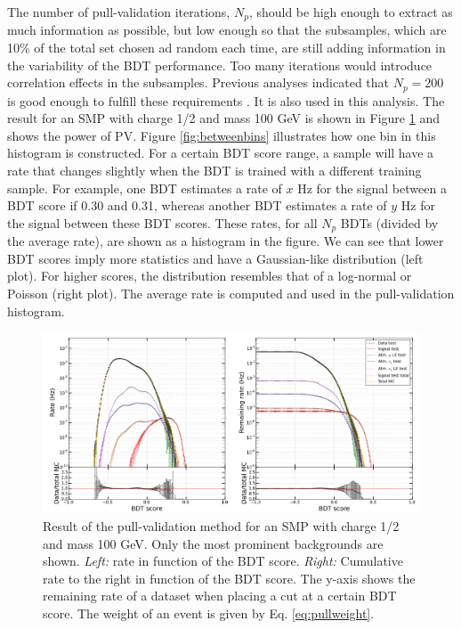 The number of pull-validation iterations, $N_p$, should be high enough to extract as much information as possible, but low enough so that the subsamples, which are 10\% of the total set chosen ad random each time, are still adding information in the variability of the BDT performance. Too many iterations would introduce correlation effects in the subsamples. Previous analyses indicated that $N_p = 200$ is good enough to fulfill these requirements \cite{Aartsen:2016fep,Aartsen:2015exf}. It is also used in this analysis. The result for an SMP with charge 1/2 and mass 100 GeV is shown in Figure \ref{fig:pullval} and shows the power of PV. Figure \ref{fig:betweenbins} illustrates how one bin in this histogram is constructed. For a certain BDT score range, a sample will have a rate that changes slightly when the BDT is trained with a different training sample. For example, one BDT estimates a rate of $x$ Hz for the signal between a BDT score if 0.30 and 0.31, whereas another BDT estimates a rate of $y$ Hz for the signal between these BDT scores. These rates, for all $N_p$ BDTs (divided by the average rate), are shown as a histogram in the figure. We can see that lower BDT scores imply more statistics and have a Gaussian-like distribution (left plot). For higher scores, the distribution resembles that of a log-normal or Poisson (right plot). The average rate is computed and used in the pull-validation histogram.\\
 
\begin{figure}
\centering
\includegraphics[width=\textwidth]{chapter8/img/pullval_result2_signal_m_100_charge1ovr2.png}
\caption{Result of the pull-validation method for an SMP with charge 1/2 and mass 100 GeV. Only the most prominent backgrounds are shown. \textit{Left: }rate in function of the BDT score. \textit{Right: }Cumulative rate to the right in function of the BDT score. The y-axis shows the remaining rate of a dataset when placing a cut at a certain BDT score. The weight of an event is given by Eq. \ref{eq:pullweight}.}
\label{fig:pullval}
\end{figure}

